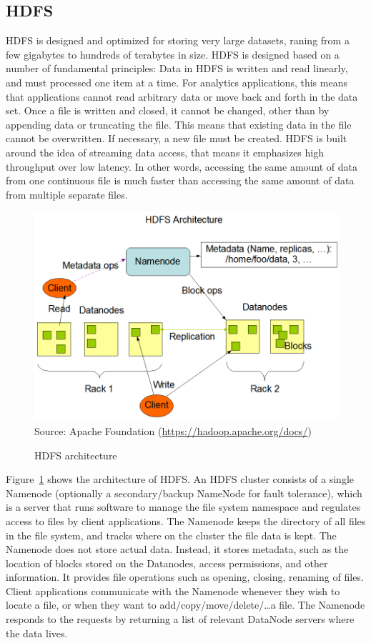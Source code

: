 \subsection{HDFS}

HDFS is designed and optimized for storing very large datasets, raning from a few gigabytes to hundreds of terabytes in size. HDFS is designed based on a number of fundamental principles: Data in HDFS is written and read linearly, and must processed one item at a time. For analytics applications, this means that applications cannot read arbitrary data or move back and forth in the data set. Once a file is written and closed, it cannot be changed, other than by appending data or truncating the file. This means that existing data in the file cannot be overwritten. If necessary, a new file must be created. HDFS is built around the idea of streaming data access, that means it emphasizes high throughput over low latency. In other words, accessing the same amount of data from one continuous file is much faster than accessing the same amount of data from multiple separate files. 

\begin{figure}
\centering

\includegraphics[width=.75\textwidth]{hdfsarchitecture.png} \\

\scriptsize Source: Apache Foundation (\url{https://hadoop.apache.org/docs/})
\caption{HDFS architecture}
\label{fig:hdfsarchitecture}
\end{figure}

Figure~\ref{fig:hdfsarchitecture} shows the architecture of HDFS. An HDFS cluster consists of a single Namenode (optionally a secondary/backup NameNode for fault tolerance), which is a server that runs software to manage the file system namespace and regulates access to files by client applications. The Namenode keeps the directory of all files in the file system, and tracks where on the cluster the file data is kept. The Namenode does not store actual data. Instead, it stores metadata, such as the location of blocks stored on the Datanodes, access permissions, and other information. It provides file operations such as opening, closing, renaming of files. Client applications communicate with the Namenode whenever they wish to locate a file, or when they want to add/copy/move/delete/\ldots a file. The Namenode responds to the requests by returning a list of relevant DataNode servers where the data lives.

